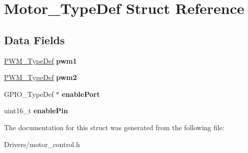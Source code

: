 \hypertarget{struct_motor___type_def}{}\section{Motor\+\_\+\+Type\+Def Struct Reference}
\label{struct_motor___type_def}
\subsection*{Data Fields}
\begin{DoxyCompactItemize}
\item 
\mbox{\label{struct_motor___type_def_ab6053993e6628cef7e5e202a05e6a0ac}} 
\hyperlink{struct_p_w_m___type_def}{P\+W\+M\+\_\+\+Type\+Def} {\bfseries pwm1}
\item 
\mbox{\label{struct_motor___type_def_afa92ea5c8db1b225b1c718099f986b8e}} 
\hyperlink{struct_p_w_m___type_def}{P\+W\+M\+\_\+\+Type\+Def} {\bfseries pwm2}
\item 
\mbox{\label{struct_motor___type_def_a0ed3538ba41cbf1643d12a76b8fcf6e1}} 
G\+P\+I\+O\+\_\+\+Type\+Def $\ast$ {\bfseries enable\+Port}
\item 
\mbox{\label{struct_motor___type_def_aa334426c266c14b33d04af6e7da3b861}} 
uint16\+\_\+t {\bfseries enable\+Pin}
\end{DoxyCompactItemize}


The documentation for this struct was generated from the following file\+:\begin{DoxyCompactItemize}
\item 
Drivers/motor\+\_\+control.\+h\end{DoxyCompactItemize}
